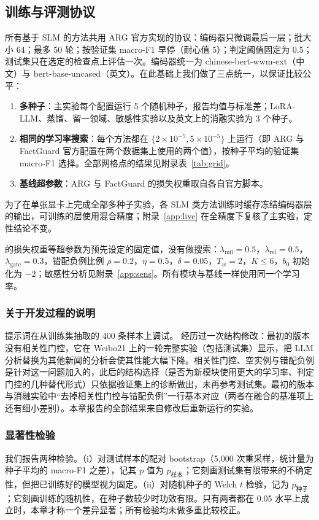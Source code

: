 \subsection{训练与评测协议}\label{sec:protocol}

所有基于 SLM 的方法共用 ARG 官方实现的协议：编码器只微调最后一层；批大小 64；最多 50 轮；按验证集 macro-F1 早停（耐心值 5）；判定阈值固定为 0.5；测试集只在选定的检查点上评估一次。编码器统一为 chinese-bert-wwm-ext\citep{cui2021wwm}（中文）与 bert-base-uncased（英文）。在此基础上我们做了三点统一，以保证比较公平：
\begin{enumerate}
\item \textbf{多种子}：主实验每个配置运行 5 个随机种子，报告均值与标准差；LoRA-LLM、蒸馏、留一领域、敏感性实验以及英文上的消融实验为 3 个种子。
\item \textbf{相同的学习率搜索}：每个方法都在 $\{2\times10^{-5},5\times10^{-5}\}$ 上运行（即 ARG 与 FactGuard 官方配置在两个数据集上使用的两个值），按种子平均的验证集 macro-F1 选择。全部网格点的结果见附录表~\ref{tab:grid}。
\item \textbf{基线超参数}：ARG 与 FactGuard 的损失权重取自各自官方脚本。
\end{enumerate}

为了在单张显卡上完成全部多种子实验，各 SLM 类方法训练时缓存冻结编码器层的输出，可训练的层使用混合精度；附录~\ref{app:live} 在全精度下复核了主实验，定性结论不变。

\method{} 的损失权重等超参数为预先设定的固定值，没有做搜索：$\lambda_{\mathrm{mil}}{=}0.5$，$\lambda_{\mathrm{rel}}{=}0.5$，$\lambda_{\mathrm{gate}}{=}0.3$，错配负例比例 $\rho{=}0.2$，$\eta{=}0.5$，$\delta{=}0.05$，$T_w{=}2$，$K\le6$，$b_0$ 初始化为 $-2$；敏感性分析见附录~\ref{app:sens}。所有模块与基线一样使用同一个学习率。

\subsubsection{关于开发过程的说明}
提示词在从训练集抽取的 400 条样本上调试。\method{} 经历过一次结构修改：最初的版本没有相关性门控，它在 Weibo21 上的一轮完整实验（包括测试集）显示，把 LLM 分析替换为其他新闻的分析会使其性能大幅下降。相关性门控、空实例与错配负例是针对这一问题加入的，此后的结构选择（是否为新模块使用更大的学习率、判定门控的几种替代形式）只依据验证集上的诊断做出，未再参考测试集。最初的版本与消融实验中“去掉相关性门控与错配负例”一行基本对应（两者在融合的基准项上还有细小差别）。本章报告的全部结果来自修改后重新运行的实验。

\subsubsection{显著性检验}
我们报告两种检验。（i）对测试样本的配对 bootstrap\citep{koehn2004statistical}（5{,}000 次重采样，统计量为种子平均的 macro-F1 之差），记其 $p$ 值为 $p_{\text{样本}}$；它刻画测试集有限带来的不确定性，但把已训练好的模型视为固定。（ii）对随机种子的 Welch $t$ 检验，记为 $p_{\text{种子}}$；它刻画训练的随机性，在种子数较少时功效有限。只有两者都在 0.05 水平上成立时，本章才称一个差异显著；所有检验均未做多重比较校正。

